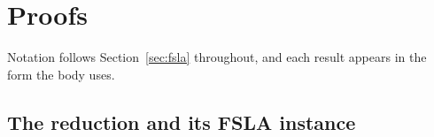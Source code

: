 \section{Proofs}
\label{apd:proofs}

Notation follows Section~\ref{sec:fsla} throughout, and each result appears in the form the body uses.

\subsection{The reduction and its FSLA instance}

